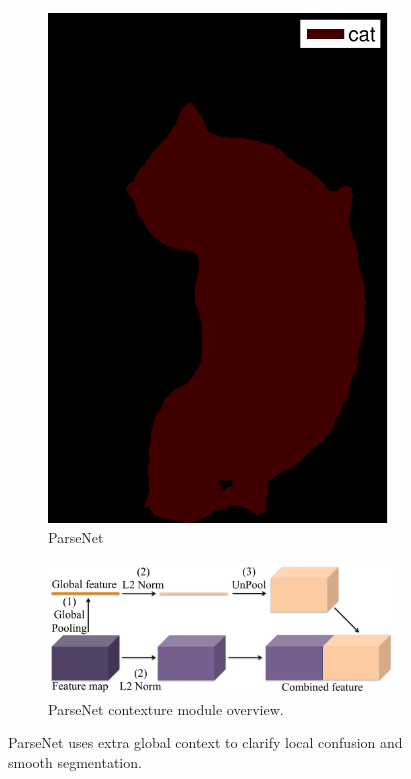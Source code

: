 \documentclass{article} %
\begin{document}
\begin{figure}[tbp]
\begin{subfigure}[b]{0.113\linewidth}
	\includegraphics[width=\linewidth]{figure/2009_002527_context-eps-converted-to.pdf}
	\caption{ParseNet}
	\label{fig:parsenetoutput}
\end{subfigure}
\hspace{0.2em}
\begin{subfigure}[b]{0.52\linewidth}
	\includegraphics[width=\linewidth]{figure/parsenet.pdf}
	\caption{ParseNet contexture module overview.}
\end{subfigure}
\caption{ParseNet uses extra global context to clarify local confusion and smooth segmentation.}
\label{fig:system}
\end{figure}
\end{document}
